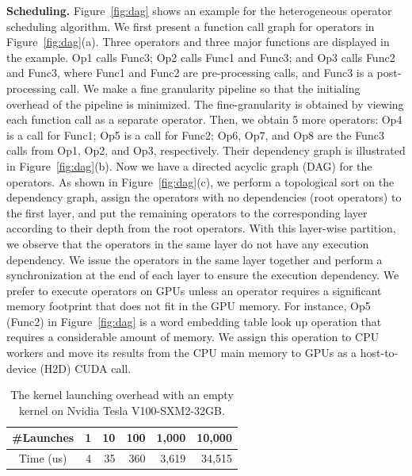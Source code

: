 \documentclass[conference]{IEEEtran}
\begin{document}
\textbf{Scheduling.} 
Figure~\ref{fig:dag} shows an example for the heterogeneous operator scheduling algorithm. We first present a function call graph for operators in Figure~\ref{fig:dag}(a). 
Three operators and three major functions are displayed in the example. 
Op1 calls Func3; Op2 calls Func1 and Func3; and Op3 calls Func2 and Func3, where Func1 and Func2 are pre-processing calls, and Func3 is a post-processing call. We make a fine granularity pipeline so that the initialing overhead of the pipeline is minimized. The fine-granularity is obtained by viewing each function call as a separate operator. Then, we obtain 5 more operators: Op4 is a call for Func1; Op5 is a call for Func2; Op6, Op7, and Op8 are the Func3 calls from Op1, Op2, and Op3, respectively. Their dependency graph is illustrated in Figure~\ref{fig:dag}(b). Now we have a directed acyclic graph (DAG) for the operators. As shown in Figure~\ref{fig:dag}(c), we perform a topological sort on the dependency graph, assign the operators with no dependencies (root operators) to the first layer, and put the remaining operators to the corresponding layer according to their depth from the root operators. With this layer-wise partition, we observe that the operators in the same layer do not have any execution dependency. We issue the operators in the same layer together and perform a synchronization at the end of each layer to ensure the execution dependency. We prefer to execute operators on GPUs unless an operator requires a significant memory footprint that does not fit in the GPU memory. 
For instance, Op5 (Func2) in Figure~\ref{fig:dag} is a word embedding table look up operation that requires a considerable amount of memory. We assign this operation to CPU workers and move its results from the CPU main memory to GPUs as a host-to-device (H2D) CUDA call.


\begin{table}[htbp]
\caption{The kernel launching overhead with an empty kernel on Nvidia Tesla V100-SXM2-32GB.}
\label{tbl:launch}
\centering
\normalsize
\begin{tabular}{c|rrrrr}
\toprule
\hline
\#Launches & 1 & 10 & 100 & 1,000 & 10,000 \\
\hline
Time (us) & 4 & 35 & 360 & 3,619 & 34,515\\
\hline
\bottomrule
\end{tabular}
\end{table}
\end{document}
